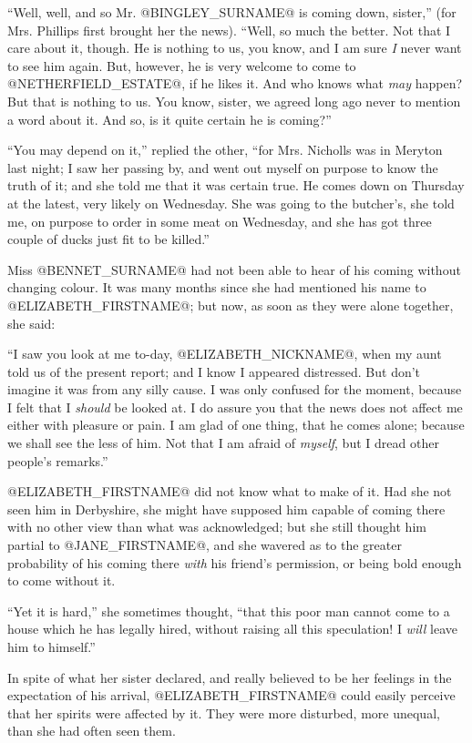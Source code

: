 ``Well, well, and so Mr. @BINGLEY_SURNAME@ is coming down, sister,'' (for Mrs.
Phillips first brought her the news). ``Well, so much the better. Not
that I care about it, though. He is nothing to us, you know, and I am
sure \textit{I} never want to see him again. But, however, he is very welcome
to come to @NETHERFIELD_ESTATE@, if he likes it. And who knows what \textit{may} happen?
But that is nothing to us. You know, sister, we agreed long ago never to
mention a word about it. And so, is it quite certain he is coming?''

``You may depend on it,'' replied the other, ``for Mrs. Nicholls was in
Meryton last night; I saw her passing by, and went out myself on purpose
to know the truth of it; and she told me that it was certain true. He
comes down on Thursday at the latest, very likely on Wednesday. She was
going to the butcher's, she told me, on purpose to order in some meat on
Wednesday, and she has got three couple of ducks just fit to be killed.''

Miss @BENNET_SURNAME@ had not been able to hear of his coming without changing
colour. It was many months since she had mentioned his name to
@ELIZABETH_FIRSTNAME@; but now, as soon as they were alone together, she said:

``I saw you look at me to-day, @ELIZABETH_NICKNAME@, when my aunt told us of the present
report; and I know I appeared distressed. But don't imagine it was from
any silly cause. I was only confused for the moment, because I felt that
I \textit{should} be looked at. I do assure you that the news does not affect
me either with pleasure or pain. I am glad of one thing, that he comes
alone; because we shall see the less of him. Not that I am afraid of
\textit{myself}, but I dread other people's remarks.''

@ELIZABETH_FIRSTNAME@ did not know what to make of it. Had she not seen him in
Derbyshire, she might have supposed him capable of coming there with no
other view than what was acknowledged; but she still thought him partial
to @JANE_FIRSTNAME@, and she wavered as to the greater probability of his coming
there \textit{with} his friend's permission, or being bold enough to come
without it.

``Yet it is hard,'' she sometimes thought, ``that this poor man cannot
come to a house which he has legally hired, without raising all this
speculation! I \textit{will} leave him to himself.''

In spite of what her sister declared, and really believed to be her
feelings in the expectation of his arrival, @ELIZABETH_FIRSTNAME@ could easily
perceive that her spirits were affected by it. They were more disturbed,
more unequal, than she had often seen them.

